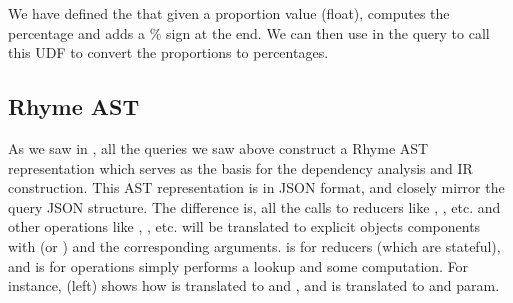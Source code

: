 \documentclass[runningheads]{llncs}
\newcommand{\lang}{Rhyme}
\begin{document}
We have defined the  that given a proportion value (float),
computes the percentage and adds a \% sign at the end.
We can then use  in the query to call this UDF to convert the
proportions to percentages.





\vspace{-3mm}
\subsection{\lang{} AST}\label{subsec:ast}
\vspace{-2mm}
As we saw in , all the queries we
saw above construct a \lang{} AST representation which serves as the basis
for the dependency analysis and IR construction.
This AST representation is in JSON format, and closely mirror the query JSON structure.
The difference is, all the calls to reducers like , , etc.
and other operations like , , etc. will be translated to
explicit objects components with  (or ) and the corresponding
arguments.
 is for reducers (which are stateful), and  is for operations
simply performs a lookup and some computation.
For instance,  (left) shows how  is translated to 
and , and  is translated to  and param.
\end{document}
